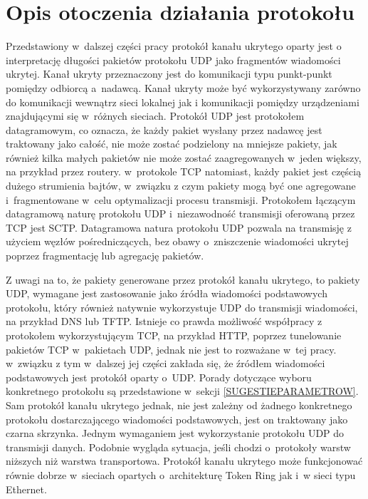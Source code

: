 \documentclass[a4paper, twoside, 12pt]{report}
\begin{document}
    \section{Opis otoczenia działania protokołu}
    Przedstawiony w~dalszej części pracy protokół kanału ukrytego oparty jest o
    interpretację długości pakietów protokołu UDP jako fragmentów wiadomości ukrytej.
    Kanał ukryty przeznaczony jest do komunikacji typu punkt-punkt pomiędzy odbiorcą a~nadawcą.
    Kanał ukryty może być wykorzystywany zarówno do komunikacji wewnątrz sieci lokalnej jak i
    komunikacji pomiędzy urządzeniami znajdującymi się w~różnych sieciach.
    Protokół UDP jest protokołem datagramowym, co
    oznacza, że każdy pakiet wysłany przez nadawcę jest traktowany jako całość, nie może zostać
    podzielony na mniejsze pakiety, jak również kilka małych pakietów nie może zostać
    zaagregowanych w~jeden większy, na przykład przez routery. w~protokole TCP natomiast,
    każdy pakiet jest częścią dużego strumienia bajtów, w~związku z czym pakiety mogą
    być one agregowane i~fragmentowane w~celu optymalizacji procesu transmisji. Protokołem
    łączącym datagramową naturę protokołu UDP i~niezawodność transmisji oferowaną przez TCP jest
    SCTP\cite{SCTPRFC}. Datagramowa natura protokołu UDP pozwala na transmisję z użyciem
    węzłów pośredniczących, bez obawy o~zniszczenie wiadomości ukrytej poprzez fragmentację
    lub agregację pakietów.

    Z uwagi na to, że pakiety generowane przez protokół kanału ukrytego, to pakiety UDP,
    wymagane jest
    zastosowanie jako źródła wiadomości podstawowych protokołu, który również
    natywnie wykorzystuje UDP do transmisji wiadomości, na przykład DNS lub TFTP.
    Istnieje co prawda możliwość współpracy z protokołem wykorzystującym TCP, na przykład HTTP,
    poprzez tunelowanie pakietów TCP w~pakietach UDP, jednak nie jest to rozważane w~tej
    pracy. w~związku z tym w~dalszej jej części zakłada się, że źródłem wiadomości
    podstawowych jest protokół oparty o~UDP. Porady dotyczące wyboru konkretnego
    protokołu są przedstawione w~sekcji \ref{SUGESTIEPARAMETROW}. Sam protokół kanału
    ukrytego jednak, nie jest zależny od żadnego konkretnego protokołu dostarczającego
    wiadomości podstawowych, jest on traktowany jako czarna skrzynka. Jednym wymaganiem
    jest wykorzystanie protokołu UDP do transmisji danych. Podobnie wygląda sytuacja,
    jeśli chodzi o~protokoły warstw niższych niż warstwa transportowa. Protokół kanału
    ukrytego może funkcjonować równie dobrze w~sieciach opartych o~architekturę
    Token Ring jak i~w sieci typu Ethernet.
\end{document}
